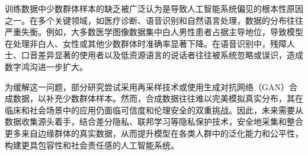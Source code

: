 
训练数据中少数群体样本的缺乏被广泛认为是导致人工智能系统偏见的根本性原因之一。在多个关键领域，如医疗诊断、语音识别和自然语言处理，数据的分布往往严重失衡。例如，大多数医学图像数据集中白人男性患者占据主导地位，导致模型在处理非白人、女性或其他少数群体时准确率显著下降。在语音识别中，残障人士、口音差异显著的使用者以及低资源语言的说话者往往被系统忽略或误识，造成数字鸿沟进一步扩大。

为缓解这一问题，部分研究尝试采用再采样技术或使用生成对抗网络（GAN）合成数据，以补充少数群体样本。然而，合成数据往往难以完美模拟真实分布，其在临床和社会场景中的应用仍面临可信度和伦理安全的双重挑战。因此，未来需要从数据收集源头着手，结合差分隐私、联邦学习等隐私保护技术，安全地采集和整合更多来自边缘群体的真实数据，从而提升模型在各类人群中的泛化能力和公平性，构建更具包容性和社会责任感的人工智能系统。